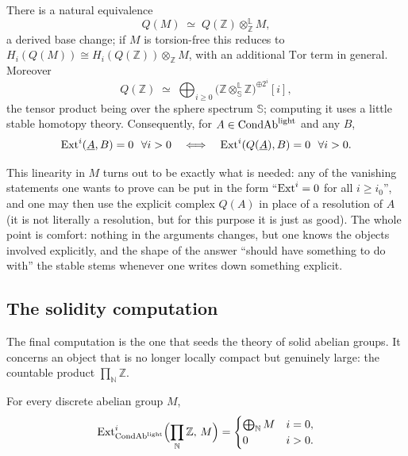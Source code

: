 \begin{theorem}
\label{thm:4:cubical-linearity}
There is a natural equivalence
\begin{equation*}
Q(M)\;\simeq\;Q(\mathbb{Z})\otimes^{\mathbb{L}}_{\mathbb{Z}}M,
\end{equation*}
a derived base change; if $M$ is torsion-free this reduces to
$H_{i}(Q(M))\cong H_{i}(Q(\mathbb{Z}))\otimes_{\mathbb{Z}}M$, with an additional
$\mathrm{Tor}$ term in general. Moreover
\begin{equation*}
Q(\mathbb{Z})\;\simeq\;\bigoplus_{i\geq0}\bigl(\mathbb{Z}\otimes^{\mathbb{L}}_{\mathbb{S}}
\mathbb{Z}\bigr)^{\oplus 2^{i}}[i],
\end{equation*}
the tensor product being over the sphere spectrum $\mathbb{S}$; computing it uses
a little stable homotopy theory. Consequently, for $A\in\mathrm{CondAb}^{\mathrm{light}}$ and any $B$,
\begin{equation*}
\operatorname{Ext}^{i}(\underline{A},B)=0\ \ \forall i>0
\quad\Longleftrightarrow\quad
\operatorname{Ext}^{i}(Q(\underline{A}),B)=0\ \ \forall i>0.
\end{equation*}
\end{theorem}

This linearity in $M$ turns out to be exactly what is needed: any of the
vanishing statements one wants to prove can be put in the form ``$\operatorname{Ext}^{i}=0$ for
all $i\geq i_0$'', and one may then use the explicit complex $Q(A)$ in place of a
resolution of $A$ (it is not literally a resolution, but for this purpose it is
just as good). The whole point is comfort: nothing in the arguments changes, but
one knows the objects involved explicitly, and the shape of the answer ``should
have something to do with'' the stable stems whenever one writes down something
explicit.

\subsection{The solidity computation}

The final computation is the one that seeds the theory of solid abelian groups.
It concerns an object that is no longer locally compact but genuinely large: the
countable product $\prod_{\mathbb{N}}\mathbb{Z}$.

\begin{corollary}
\label{cor:4:solid-generator}
For every discrete abelian group $M$,
\begin{equation*}
\operatorname{Ext}^{i}_{\mathrm{CondAb}^{\mathrm{light}}}\Bigl(\prod_{\mathbb{N}}\mathbb{Z},\,M\Bigr)=
\begin{cases}
\bigoplus_{\mathbb{N}}M & i=0,\\
0 & i>0.
\end{cases}
\end{equation*}
\end{corollary}

